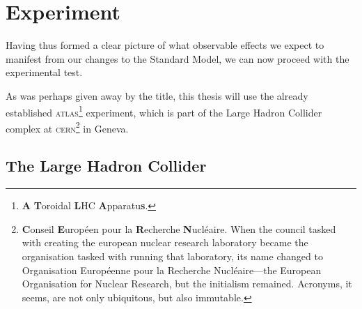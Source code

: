 \chapter{Experiment}\label{ch.exp}

Having thus formed a clear picture of what observable effects we expect to manifest from our changes to the Standard Model, we can now proceed with the experimental test.

As was perhaps given away by the title, this thesis will use the already established \textsc{atlas}\footnote{\textbf{A} \textbf{T}oroidal \textbf{L}HC \textbf{A}pparatu\textbf{s}.} experiment, which is part of the Large Hadron Collider complex at \textsc{cern}\footnote{\textbf{C}onseil \textbf{E}uropéen pour la \textbf{R}echerche \textbf{N}ucléaire. When the council tasked with creating the european nuclear research laboratory became the organisation tasked with running that laboratory, its name changed to Organisation Européenne pour la Recherche Nucléaire---the European Organisation for Nuclear Research, but the initialism remained. Acronyms, it seems, are not only ubiquitous, but also immutable.} in Geneva.

\section{The Large Hadron Collider}

